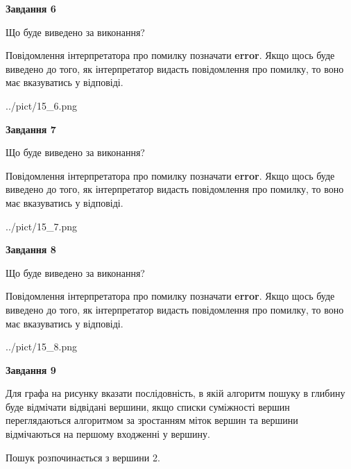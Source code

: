 \documentclass[12pt, ukrainian]{article}
\begin{document}
{\begin {large}
{\begin {center}\textbf{Завдання 6}\end {center}}\par
Що буде виведено за виконання?

Повідомлення інтерпретатора про помилку позначати \textbf{error}.
Якщо щось буде виведено до того, як інтерпретатор видасть повідомлення про помилку, 
то воно має вказуватись у відповіді. \par


\begin{center}
	{../pict/15_6.png}
\end{center}
\newpage

{\begin {center}\textbf{Завдання 7}\end {center}}\par
Що буде виведено за виконання?

Повідомлення інтерпретатора про помилку позначати \textbf{error}.
Якщо щось буде виведено до того, як інтерпретатор видасть повідомлення про помилку, 
то воно має вказуватись у відповіді. \par


\begin{center}
	{../pict/15_7.png}
\end{center}
\newpage

{\begin {center}\textbf{Завдання 8}\end {center}}\par
Що буде виведено за виконання?

Повідомлення інтерпретатора про помилку позначати \textbf{error}.
Якщо щось буде виведено до того, як інтерпретатор видасть повідомлення про помилку, 
то воно має вказуватись у відповіді. \par


\begin{center}
	{../pict/15_8.png}
\end{center}
\newpage

{\begin {center}\textbf{Завдання 9}\end {center}}\par
Для графа на рисунку вказати послідовність, в якій алгоритм пошуку в глибину буде відмічати відвідані вершини, якщо списки суміжності вершин переглядаються алгоритмом за зростанням міток вершин та вершини відмічаються на першому вход\-женні у вершину.\par
Пошук розпочинається з вершини 2.\par


\end{large}}
\end{document}
